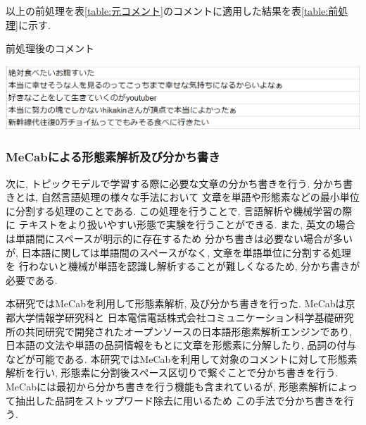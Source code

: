 \documentclass{ltjarticle}
\begin{document}
以上の前処理を表\ref{table:元コメント}のコメントに適用した結果を表\ref{table:前処理}に示す. 
\begin{table}[h]
    \centering
    \caption{前処理後のコメント}
    \vspace{5truept}

    \includegraphics[width=14.5cm]{images/前処理適用.png}
    \label{table:前処理}
\end{table}

\subsubsection{MeCabによる形態素解析及び分かち書き}
次に, トピックモデルで学習する際に必要な文章の分かち書きを行う. 分かち書きとは, 自然言語処理の様々な手法において
文章を単語や形態素などの最小単位に分割する処理のことである. この処理を行うことで, 言語解析や機械学習の際に
テキストをより扱いやすい形態で実験を行うことができる. また, 英文の場合は単語間にスペースが明示的に存在するため
分かち書きは必要ない場合が多いが, 日本語に関しては単語間のスペースがなく, 文章を単語単位に分割する処理を
行わないと機械が単語を認識し解析することが難しくなるため, 分かち書きが必要である. 

本研究ではMeCabを利用して形態素解析, 及び分かち書きを行った. MeCabは京都大学情報学研究科と
日本電信電話株式会社コミュニケーション科学基礎研究所の共同研究で開発されたオープンソースの日本語形態素解析エンジンであり, 
日本語の文法や単語の品詞情報をもとに文章を形態素に分解したり, 品詞の付与などが可能である. 
本研究ではMeCabを利用して対象のコメントに対して形態素解析を行い, 形態素に分割後スペース区切りで繋ぐことで分かち書きを行う. 
MeCabには最初から分かち書きを行う機能も含まれているが, 形態素解析によって抽出した品詞をストップワード除去に用いるため
この手法で分かち書きを行う. 
   
\end{document}
